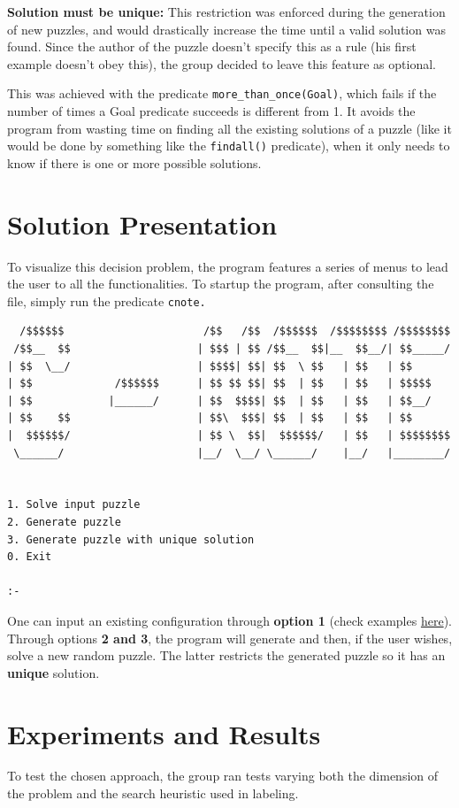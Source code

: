 \documentclass[runningheads]{llncs}
\begin{document}
\textbf{Solution must be unique:} This restriction was enforced during the generation of new puzzles, and would drastically increase the time until a valid solution was found. Since the author of the puzzle doesn't specify this as a rule (his first example doesn't obey this), the group decided to leave this feature as optional.

This was achieved with the predicate \verb!more_than_once(Goal)!, \cite{ref-more} which fails if the number of times a Goal predicate succeeds is different from 1. It avoids the program from wasting time on finding all the existing solutions of a puzzle (like it would be done by something like the \verb!findall()! predicate), when it only needs to know if there is one or more possible solutions.

\newpage
\section{Solution Presentation}
To visualize this decision problem, the program features a series of menus to lead the user to all the functionalities. To startup the program, after consulting the file, simply run the predicate \verb!cnote.!
\begin{verbatim}
  /$$$$$$                      /$$   /$$  /$$$$$$  /$$$$$$$$ /$$$$$$$$
 /$$__  $$                    | $$$ | $$ /$$__  $$|__  $$__/| $$_____/
| $$  \__/                    | $$$$| $$| $$  \ $$   | $$   | $$      
| $$             /$$$$$$      | $$ $$ $$| $$  | $$   | $$   | $$$$$   
| $$            |______/      | $$  $$$$| $$  | $$   | $$   | $$__/   
| $$    $$                    | $$\  $$$| $$  | $$   | $$   | $$      
|  $$$$$$/                    | $$ \  $$|  $$$$$$/   | $$   | $$$$$$$$
 \______/                     |__/  \__/ \______/    |__/   |________/


1. Solve input puzzle
2. Generate puzzle
3. Generate puzzle with unique solution
0. Exit

:- 
\end{verbatim}

One can input an existing configuration through \textbf{option 1} (check examples \href{https://erich-friedman.github.io/puzzle/100/}{here}).
Through options \textbf{2 and 3}, the program will generate and then, if the user wishes, solve a new random puzzle. The latter restricts the generated puzzle so it has an \textbf{unique} solution.

\section{Experiments and Results}
To test the chosen approach, the group ran tests varying both the dimension of the problem and the search heuristic used in labeling.
\end{document}
